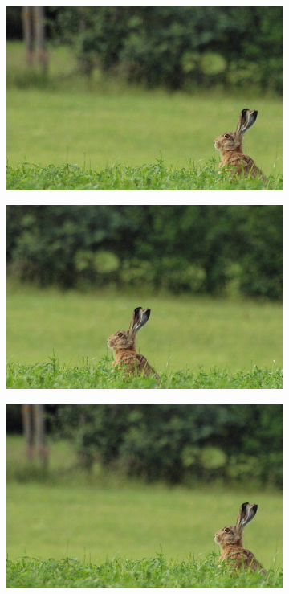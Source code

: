 \begin{figure}[H]
    \begin{subfigure}{0.32\textwidth}
      \centering
      \includegraphics[scale=1.0]{obrazky/cropIttizajic2-big.jpg}
      \caption{}
    \end{subfigure}
    \begin{subfigure}{.32\textwidth}
      \centering
      \includegraphics[scale=1.0]{obrazky/cropAchantazajic2-big.jpg}
      \caption{}
    \end{subfigure}
    \begin{subfigure}{.32\textwidth}
      \centering
      \includegraphics[scale=1.0]{obrazky/cropStentifordzajic2-big.jpg}
      \caption{}
    \end{subfigure}
    \vspace{1pt}
    

\end{figure}
